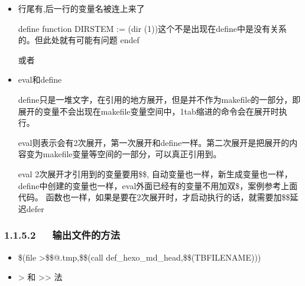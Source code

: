 \documentclass[letterpaper,12pt,english]{sphinxmanual}
\begin{document}
\begin{itemize}
\item {} 
行尾有,后一行的变量名被连上来了

\begin{sphinxVerbatim}[commandchars=\\\{\}]
define function
DIR\PYGZus{}STEM := \PYGZdl{}(dir \PYGZdl{}(1))\PYGZsh{}这个不是出现在define中是没有关系的。但此处就有可能有问题
endef
\end{sphinxVerbatim}

或者

\begin{sphinxVerbatim}[commandchars=\\\{\}]
  \PYGZbs{}\PYGZbs{}
\end{sphinxVerbatim}

\item {} 
eval和define

define只是一堆文字，在引用的地方展开，但是并不作为makefile的一部分，即展开的变量不会出现在makefile变量空间中，1tab缩进的命令会在展开时执行。

eval则表示会有2次展开，第一次展开和define一样。第二次展开是把展开的内容变为makefile变量等空间的一部分，可以真正引用到。

eval 2次展开才引用到的变量要用\$\$, 自动变量也一样，新生成变量也一样，define中创建的变量也一样，eval外面已经有的变量不用加双\$，案例参考上面代码。
函数也一样，如果是要在2次展开时，才启动执行的话，就需要加\$\$延迟defer

\end{itemize}


\subsubsection{1.1.5.2   输出文件的方法}
\label{\detokenize{001software/001install/make:id16}}\begin{itemize}
\item {} 
\$(file >\$\$@.tmp,\$\$(call def\_hexo\_md\_head,\$\$(TBFILENAME)))

\item {} 
> 和 >> 法

\end{itemize}
\end{document}
